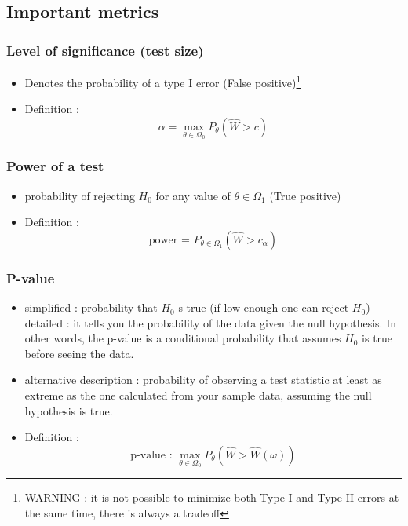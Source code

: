 \documentclass{article}
\begin{document}
\subsection{Important metrics }

\subsubsection{Level of significance (test size)}
\begin{itemize}
    \item Denotes the probability of a type I error (False positive)\footnote{WARNING : it is not possible to minimize both Type I and Type II errors at the same time, there is always a tradeoff}
    \item Definition : 
\begin{equation}
    \alpha = \max_{\theta\in\Omega_0}P_{\theta}(\hat{W}>c)
\end{equation}
\end{itemize}

\subsubsection{Power of a test}
\begin{itemize}
    \item probability of rejecting $H_0$ for any value of $\theta\in\Omega_1$ (True positive)
    \item Definition : 
    \begin{equation}
        \text{power = }P_{\theta\in\Omega_1}(\hat{W}>c_{\alpha})
    \end{equation}
\end{itemize}

\subsubsection{P-value}
\begin{itemize}
    \item simplified : probability that $H_0$ s true (if low enough one can reject $H_0$)
    \subitem - detailed : it tells you the probability of the data given the null hypothesis. In other words, the p-value is a conditional probability that assumes $H_0$ is true before seeing the data.
    \item alternative description : probability of observing a test statistic at least as extreme as the one calculated from your sample data, assuming the null hypothesis is true.
    \item Definition : 
\begin{equation}
    \text{p-value : } \max_{\theta\in\Omega_0}P_{\theta}(\hat{W}>\hat{W}(\omega))
\end{equation}
\end{itemize}
\end{document}
